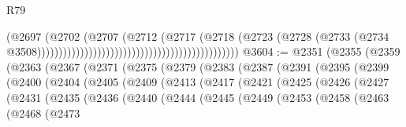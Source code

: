 \begin{lexlean}{R79}
\begin{coremodule}
                                                                              (@2697
                                                                                (@2702
                                                                                  (@2707
                                                                                    (@2712
                                                                                      (@2717
                                                                                        (@2718
                                                                                          (@2723
                                                                                            (@2728
                                                                                              (@2733
                                                                                                (@2734
                                                                                                  @3508)))))))))))))))))))))))))))))))))))))))))))))))
@3604 := @2351
    (@2355
      (@2359
        (@2363
          (@2367
            (@2371
              (@2375
                (@2379
                  (@2383
                    (@2387
                      (@2391
                        (@2395
                          (@2399
                            (@2400
                              (@2404
                                (@2405
                                  (@2409
                                    (@2413
                                      (@2417
                                        (@2421
                                          (@2425
                                            (@2426
                                              (@2427
                                                (@2431
                                                  (@2435
                                                    (@2436
                                                      (@2440
                                                        (@2444
                                                          (@2445
                                                            (@2449
                                                              (@2453
                                                                (@2458
                                                                  (@2463
                                                                    (@2468
                                                                      (@2473

\end{coremodule}
\end{lexlean}
